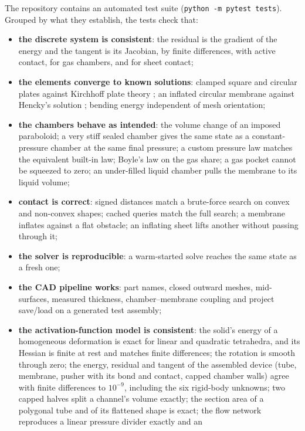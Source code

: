 \documentclass[11pt,a4paper]{article}
\newcommand{\code}[1]{\texttt{#1}}
\theoremstyle{remark}
\begin{document}
The repository contains an automated test suite (\code{python -m pytest tests}). Grouped by what
they establish, the tests check that:
\begin{itemize}
\item \textbf{the discrete system is consistent}: the residual is the gradient of the energy and
      the tangent is its Jacobian, by finite differences, with active contact, for gas chambers,
      and for sheet contact;
\item \textbf{the elements converge to known solutions}: clamped square and circular plates
      against Kirchhoff plate theory \cite{timoshenko1959}; an inflated circular membrane against
      Hencky's solution \cite{hencky1915}; bending energy independent of mesh orientation;
\item \textbf{the chambers behave as intended}: the volume change of an imposed paraboloid; a
      very stiff sealed chamber gives the same state as a constant-pressure chamber at the same
      final pressure; a custom pressure law matches the equivalent built-in law; Boyle's law on the
      gas share; a gas pocket cannot be squeezed to zero; an under-filled liquid chamber pulls the
      membrane to its liquid volume;
\item \textbf{contact is correct}: signed distances match a brute-force search on convex and
      non-convex shapes; cached queries match the full search; a membrane inflates against a flat
      obstacle; an inflating sheet lifts another without passing through it;
\item \textbf{the solver is reproducible}: a warm-started solve reaches the same state as a fresh
      one;
\item \textbf{the CAD pipeline works}: part names, closed outward meshes, mid-surfaces, measured
      thickness, chamber--membrane coupling and project save/load on a generated test assembly;
\item \textbf{the activation-function model is consistent}: the solid's energy of a homogeneous
      deformation is exact for linear and quadratic tetrahedra, and its Hessian is finite at rest and
      matches finite differences; the rotation is smooth through zero; the energy, residual and
      tangent of the assembled device (tube, membrane, pusher with its bond and contact, capped chamber
      walls) agree with finite differences to $10^{-9}$, including the six rigid-body unknowns; two
      capped halves split a channel's volume exactly; the section area of a polygonal tube and of its
      flattened shape is exact; the flow network reproduces a linear pressure divider exactly and an

\end{itemize}
\end{document}
